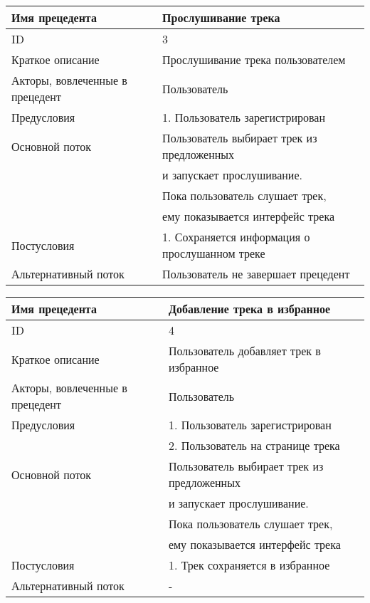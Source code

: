 \bigskip\noindent
\begin{tabular}{|l|l|}
    \hline Имя прецедента                  & Прослушивание трека \\
    \hline ID                              & 3 \\
    \hline Краткое описание                & Прослушивание трека пользователем \\
    \hline Акторы, вовлеченные в прецедент & Пользователь \\
    \hline Предусловия                     & 1. Пользователь зарегистрирован \\
    \hline Основной поток                  & Пользователь выбирает трек из предложенных \\
                                           & и запускает прослушивание. \\
                                           & Пока пользователь слушает трек, \\
                                           & ему показывается интерфейс трека \\
    \hline Постусловия                     & 1. Сохраняется информация о прослушанном треке \\
    \hline Альтернативный поток            & Пользователь не завершает прецедент \\
    \hline
\end{tabular}

\bigskip\noindent
\begin{tabular}{|l|l|}
    \hline Имя прецедента                  & Добавление трека в избранное \\
    \hline ID                              & 4 \\
    \hline Краткое описание                & Пользователь добавляет трек в избранное \\
    \hline Акторы, вовлеченные в прецедент & Пользователь \\
    \hline Предусловия                     & 1. Пользователь зарегистрирован \\
                                           & 2. Пользователь на странице трека \\
    \hline Основной поток                  & Пользователь выбирает трек из предложенных \\
                                           & и запускает прослушивание. \\
                                           & Пока пользователь слушает трек, \\
                                           & ему показывается интерфейс трека \\
    \hline Постусловия                     & 1. Трек сохраняется в избранное \\
    \hline Альтернативный поток            & - \\
    \hline
\end{tabular}

